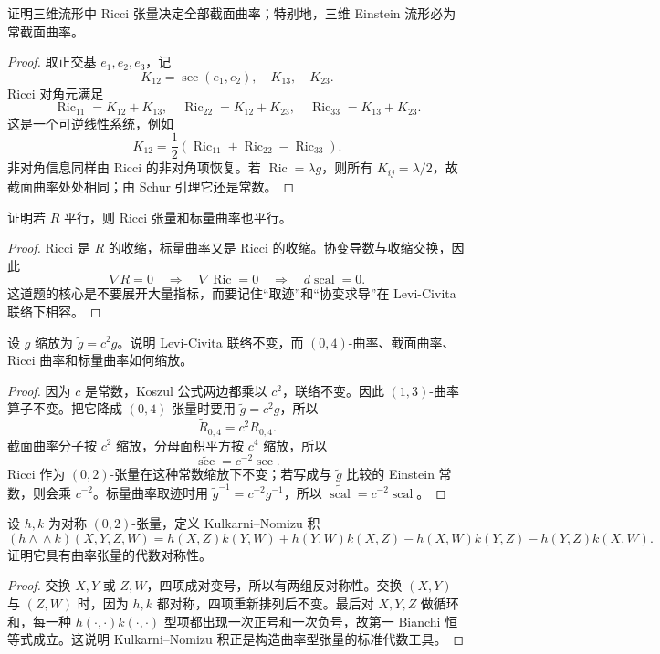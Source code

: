 \documentclass[11pt,a4paper,openany]{ctexbook}
\numberwithin{equation}{chapter}
\begin{document}
\begin{problem}
证明三维流形中 Ricci 张量决定全部截面曲率；特别地，三维 Einstein 流形必为常截面曲率。
\end{problem}
\begin{proof}
取正交基 \(e_1,e_2,e_3\)，记
\[
K_{12}=\operatorname{sec}(e_1,e_2),\quad K_{13},\quad K_{23}.
\]
Ricci 对角元满足
\[
\operatorname{Ric}_{11}=K_{12}+K_{13},\quad
\operatorname{Ric}_{22}=K_{12}+K_{23},\quad
\operatorname{Ric}_{33}=K_{13}+K_{23}.
\]
这是一个可逆线性系统，例如
\[
K_{12}=\frac12(\operatorname{Ric}_{11}+\operatorname{Ric}_{22}-\operatorname{Ric}_{33}).
\]
非对角信息同样由 Ricci 的非对角项恢复。若 \(\operatorname{Ric}=\lambda g\)，则所有 \(K_{ij}=\lambda/2\)，故截面曲率处处相同；由 Schur 引理它还是常数。
\end{proof}

\begin{problem}
证明若 \(R\) 平行，则 Ricci 张量和标量曲率也平行。
\end{problem}
\begin{proof}
Ricci 是 \(R\) 的收缩，标量曲率又是 Ricci 的收缩。协变导数与收缩交换，因此
\[
\nabla R=0\quad\Longrightarrow\quad \nabla\operatorname{Ric}=0
\quad\Longrightarrow\quad d\operatorname{scal}=0.
\]
这道题的核心是不要展开大量指标，而要记住“取迹”和“协变求导”在 Levi-Civita 联络下相容。
\end{proof}

\begin{problem}
设 \(g\) 缩放为 \(\tilde g=c^2g\)。说明 Levi-Civita 联络不变，而 \((0,4)\)-曲率、截面曲率、Ricci 曲率和标量曲率如何缩放。
\end{problem}
\begin{proof}
因为 \(c\) 是常数，Koszul 公式两边都乘以 \(c^2\)，联络不变。因此 \((1,3)\)-曲率算子不变。把它降成 \((0,4)\)-张量时要用 \(\tilde g=c^2g\)，所以
\[
\tilde R_{0,4}=c^2R_{0,4}.
\]
截面曲率分子按 \(c^2\) 缩放，分母面积平方按 \(c^4\) 缩放，所以
\[
\widetilde{\operatorname{sec}}=c^{-2}\operatorname{sec}.
\]
Ricci 作为 \((0,2)\)-张量在这种常数缩放下不变；若写成与 \(\tilde g\) 比较的 Einstein 常数，则会乘 \(c^{-2}\)。标量曲率取迹时用 \(\tilde g^{-1}=c^{-2}g^{-1}\)，所以 \(\widetilde{\operatorname{scal}}=c^{-2}\operatorname{scal}\)。
\end{proof}

\begin{problem}
设 \(h,k\) 为对称 \((0,2)\)-张量，定义 Kulkarni--Nomizu 积
\[
(h\wedge\!\!\wedge k)(X,Y,Z,W)=h(X,Z)k(Y,W)+h(Y,W)k(X,Z)-h(X,W)k(Y,Z)-h(Y,Z)k(X,W).
\]
证明它具有曲率张量的代数对称性。
\end{problem}
\begin{proof}
交换 \(X,Y\) 或 \(Z,W\)，四项成对变号，所以有两组反对称性。交换 \((X,Y)\) 与 \((Z,W)\) 时，因为 \(h,k\) 都对称，四项重新排列后不变。最后对 \(X,Y,Z\) 做循环和，每一种 \(h(\cdot,\cdot)k(\cdot,\cdot)\) 型项都出现一次正号和一次负号，故第一 Bianchi 恒等式成立。这说明 Kulkarni--Nomizu 积正是构造曲率型张量的标准代数工具。
\end{proof}
\end{document}
